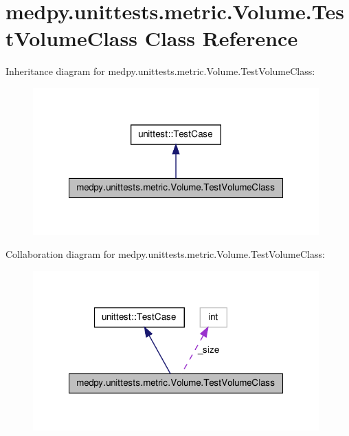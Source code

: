 \hypertarget{classmedpy_1_1unittests_1_1metric_1_1Volume_1_1TestVolumeClass}{
\section{medpy.unittests.metric.Volume.TestVolumeClass Class Reference}
\label{classmedpy_1_1unittests_1_1metric_1_1Volume_1_1TestVolumeClass}
}


Inheritance diagram for medpy.unittests.metric.Volume.TestVolumeClass:\nopagebreak
\begin{figure}[H]
\begin{center}
\leavevmode
\includegraphics[width=312pt]{classmedpy_1_1unittests_1_1metric_1_1Volume_1_1TestVolumeClass__inherit__graph}
\end{center}
\end{figure}


Collaboration diagram for medpy.unittests.metric.Volume.TestVolumeClass:\nopagebreak
\begin{figure}[H]
\begin{center}
\leavevmode
\includegraphics[width=312pt]{classmedpy_1_1unittests_1_1metric_1_1Volume_1_1TestVolumeClass__coll__graph}
\end{center}
\end{figure}
